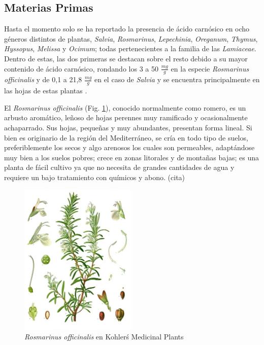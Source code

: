 \documentclass[11pt,a4paper]{article}
\begin{document}
\subsection{Materias Primas}

Hasta el momento solo se ha reportado la presencia de ácido carnósico en ocho géneros distintos de plantas, \textit{Salvia}, \textit{Rosmarinus}, \textit{Lepechinia}, \textit{Oreganum}, \textit{Thymus}, \textit{Hyssopus}, \textit{Melissa} y \textit{Ocimum}; todas pertenecientes a la familia de las \textit{Lamiaceae}.
Dentro de estas, las dos primeras se destacan sobre el resto debido a su mayor contenido de ácido carnósico, rondando los 3 a 50 $\frac{mg}{g}$ en la especie \textit{Rosmarinus officinalis} y de 0,1 a 21,8 $\frac{mg}{g}$ en el caso de \textit{Salvia} y se encuentra principalmente en las hojas de estas plantas \cite{carnosic_review}.

El \textit{Rosmarinus officinalis} (Fig. \ref{romero1_hojas}), conocido normalmente como romero, es un arbusto aromático, leñoso de hojas perennes muy ramificado y ocasionalmente achaparrado. Sus hojas, pequeñas y muy abundantes, presentan forma lineal. Si bien es originario de la región del Mediterráneo, se cría en todo tipo de suelos, preferiblemente los secos y algo arenosos los cuales son permeables, adaptándose muy bien a los suelos pobres; crece en zonas litorales y de montañas bajas; es una planta de fácil cultivo ya que no necesita de grandes cantidades de agua y requiere un bajo tratamiento con químicos y abono. (cita) 

\begin{figure}[H]
\centering
	\includegraphics[width=0.5\textwidth]{romero1_hojas}
	\caption{\textit{Rosmarinus officinalis} en Kohler\'s Medicinal Plants\label{romero1_hojas}}
\end{figure}
\end{document}

